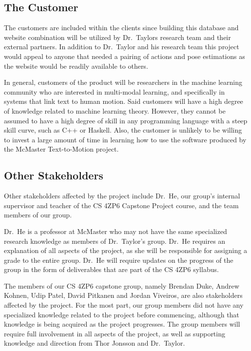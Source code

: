 \documentclass{scrreprt}
\begin{document}
\subsection{The Customer}

The customers are included within the clients since building this database and
website combination will be utilized by Dr.\ Taylors research team and their
external partners. In addition to Dr.\ Taylor and his research team this project
would appeal to anyone that needed a pairing of actions and pose estimations as
the website would be readily available to others.

In general, customers of the product will be researchers in the machine
learning community who are interested in multi-modal learning, and specifically
in systems that link text to human motion. Said customers will have a high
degree of knowledge related to machine learning theory. However, they cannot be
assumed to have a high degree of skill in any programming language with a steep
skill curve, such as C++ or Haskell. Also, the customer is unlikely to be
willing to invest a large amount of time in learning how to use the software
produced by the McMaster Text-to-Motion project.

\subsection{Other Stakeholders}

Other stakeholders affected by the project include Dr.\ He, our group's internal
supervisor and teacher of the CS 4ZP6 Capstone Project course, and the team
members of our group.

Dr.\ He is a professor at McMaster who may not have the same specialized
research knowledge as members of Dr.\ Taylor's group. Dr.\ He requires an
explanation of all aspects of the project, as she will be responsible for
assigning a grade to the entire group. Dr.\ He will require updates on the
progress of the group in the form of deliverables that are part of the CS 4ZP6
syllabus.

The members of our CS 4ZP6 capstone group, namely Brendan Duke, Andrew Kohnen,
Udip Patel, David Pitkanen and Jordan Viveiros, are also stakeholders affected
by the project. For the most part, our group members did not have any
specialized knowledge related to the project before commencing, although that
knowledge is being acquired as the project progresses. The group members will
require full involvement in all aspects of the project, as well as supporting
knowledge and direction from Thor Jonsson and Dr.\ Taylor.
\end{document}
